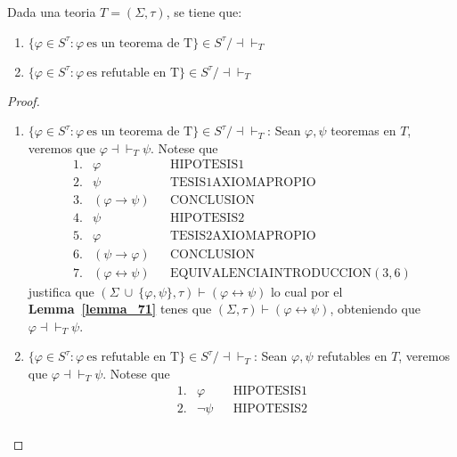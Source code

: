   \begin{lemma} \label{lemma_75}
    \PN Dada una teoria $T = (\Sigma, \tau)$, se tiene que:
    \begin{enumerate}[(1)]
      \item $\{\varphi \in S^{\tau}: \varphi \ \text{es un teorema de T}\} \in S^{\tau}/ \dashv \vdash_{T}$
      \item $\{\varphi \in S^{\tau}: \varphi \ \text{es refutable en T}\} \in S^{\tau}/ \dashv \vdash_{T}$
    \end{enumerate}
  \end{lemma}
  \begin{proof}
    \begin{enumerate}[(1)]
      \item $\{\varphi \in S^{\tau}: \varphi \ \text{es un teorema de T}\} \in S^{\tau}/ \dashv \vdash_{T}$: Sean
        $\varphi, \psi$ teoremas en $T$, veremos que $\varphi \dashv \vdash_{T} \psi$. Notese que
        \[
          \begin{array}{llll}
            1. & \varphi && \text{HIPOTESIS1} \\
            2. & \psi && \text{TESIS1AXIOMAPROPIO} \\
            3. & (\varphi \rightarrow \psi) && \text{CONCLUSION} \\
            4. & \psi && \text{HIPOTESIS2} \\
            5. & \varphi && \text{TESIS2AXIOMAPROPIO} \\
            6. & (\psi \rightarrow \varphi) && \text{CONCLUSION} \\
            7. & (\varphi \leftrightarrow \psi) && \text{EQUIVALENCIAINTRODUCCION}(3,6)
          \end{array}
        \]
        \PN justifica que $(\Sigma \ \cup \ \{\varphi, \psi\}, \tau) \vdash (\varphi \leftrightarrow \psi)$ lo cual por
        el \textbf{Lemma~\ref{lemma_71}} tenes que $(\Sigma, \tau) \vdash (\varphi \leftrightarrow \psi)$, obteniendo
        que $\varphi \dashv \vdash_{T} \psi$.
      \item $\{\varphi \in S^{\tau}: \varphi \ \text{es refutable en T}\} \in S^{\tau}/ \dashv \vdash_{T}$: Sean
        $\varphi, \psi$ refutables en $T$, veremos que $\varphi \dashv \vdash_{T} \psi$. Notese que
        \[
          \begin{array}{llll}
            1. & \varphi && \text{HIPOTESIS1} \\
            2. & \lnot \psi && \text{HIPOTESIS2} \\

\end{array}\]
\end{enumerate}
\end{proof}
